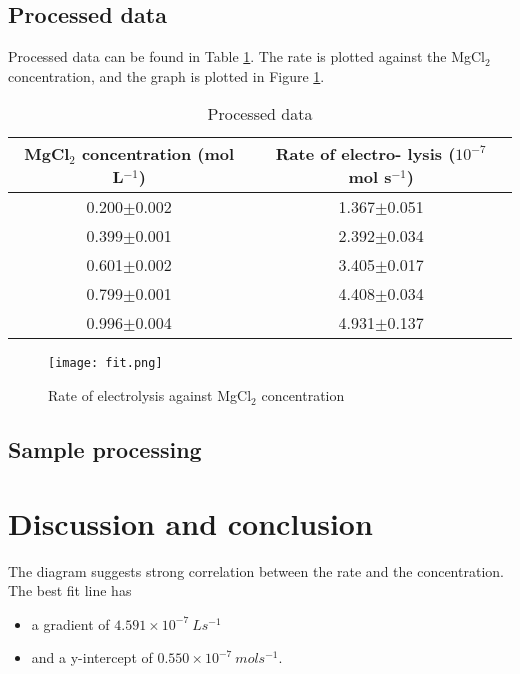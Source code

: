 \documentclass[a4paper]{article}
\begin{document}
\subsection{Processed data}

Processed data can be found in Table \ref{tab.proc}. The rate is plotted against the MgCl$_2$ concentration, and the graph is plotted in Figure \ref{fig.proc}.

\begin{table}[h!]
\centering
\caption{Processed data}
\label{tab.proc}
\begin{tabular}{cc}
\hline
\makecell{MgCl$_2$ concentration\\ (mol L$^{-1}$)} & \makecell{Rate of electro-\\lysis ($10^{-7}$ mol s$^{-1}$)} \\

\hline
0.200$\pm$0.002 & 1.367$\pm$0.051 \\
0.399$\pm$0.001 & 2.392$\pm$0.034 \\
0.601$\pm$0.002 & 3.405$\pm$0.017 \\
0.799$\pm$0.001 & 4.408$\pm$0.034 \\
0.996$\pm$0.004 & 4.931$\pm$0.137 \\
\hline
\end{tabular}
\end{table}

\begin{figure}
    \centering
    \texttt{[image: fit.png]}
    \caption{Rate of electrolysis against MgCl$_2$ concentration}
    \label{fig.proc}
\end{figure}


\subsection{Sample processing}

\section{Discussion and conclusion}

The diagram suggests strong correlation between the rate and the concentration. The best fit line has 

\begin{itemize}
    \item a gradient of $4.591 \times 10^{-7}\SI{}{L s^{-1}}$
    \item and a y-intercept of $0.550\times 10^{-7} \SI{}{mol s^{-1}}$.
\end{itemize}
\end{document}
